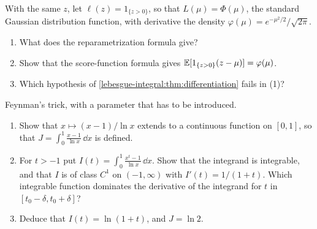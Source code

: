 \begin{notechapter}
\begin{exercise}\label{lebesgue-integral:exr:9}
With the same $z$, let $\ell(z) = 1_{\{z > 0\}}$, so that
$L(\mu) = \Phi(\mu)$, the standard Gaussian distribution function, with
derivative the density
$\varphi(\mu) = e^{-\mu^2/2}/\sqrt{2\pi}$.
\begin{enumerate}[nosep]
  \item What does the reparametrization formula give?
  \item Show that the score-function formula gives
        $\mathbb{E}[1_{\{z > 0\}}(z - \mu)] = \varphi(\mu)$.
  \item Which hypothesis of
        \cref{lebesgue-integral:thm:differentiation} fails in (1)?
\end{enumerate}
\end{exercise}

\begin{exercise}\label{lebesgue-integral:exr:10}
Feynman's trick, with a parameter that has to be introduced.
\begin{enumerate}[nosep]
  \item Show that $x\mapsto(x - 1)/\ln x$ extends to a continuous
        function on $[0, 1]$, so that
        $J = \int_0^1\frac{x - 1}{\ln x}\,\dd x$ is defined.
  \item For $t > -1$ put
        $I(t) = \int_0^1\frac{x^t - 1}{\ln x}\,\dd x$. Show that the
        integrand is integrable, and that $I$ is of class $C^1$ on
        $(-1, \infty)$ with $I'(t) = 1/(1 + t)$. Which integrable
        function dominates the derivative of the integrand for $t$ in
        $[t_0 - \delta, t_0 + \delta]$?
  \item Deduce that $I(t) = \ln(1 + t)$, and $J = \ln2$.
\end{enumerate}
\end{exercise}
\end{notechapter}
